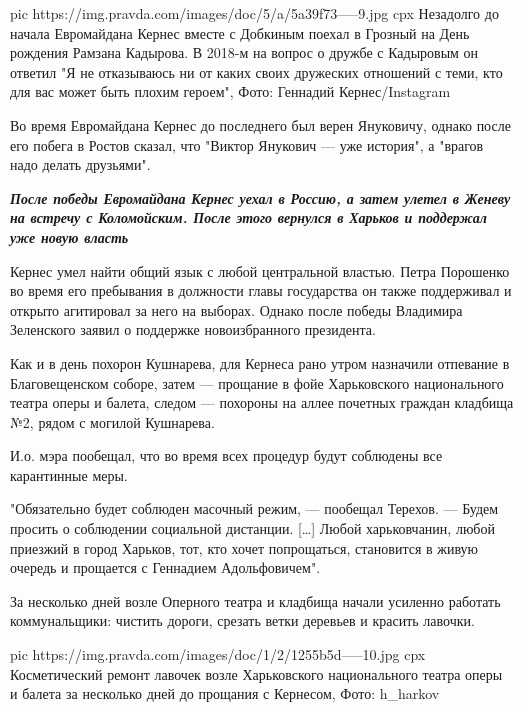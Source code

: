 \ifcmt
pic https://img.pravda.com/images/doc/5/a/5a39f73-----9.jpg
cpx Незадолго до начала Евромайдана Кернес вместе с Добкиным поехал в Грозный на День рождения Рамзана Кадырова. В 2018-м на вопрос о дружбе с Кадыровым он ответил "Я не отказываюсь ни от каких своих дружеских отношений с теми, кто для вас может быть плохим героем", Фото: Геннадий Кернес/Instagram
\fi

Во время Евромайдана Кернес до последнего был верен Януковичу, однако после его
побега в Ростов сказал, что "Виктор Янукович — уже история", а "врагов надо
делать друзьями". 


\begin{leftbar}
  \begingroup
    \em\Large\bfseries\color{blue} После победы Евромайдана Кернес уехал в
        Россию, а затем улетел в Женеву на встречу с Коломойским. После этого
        вернулся в Харьков и поддержал уже новую власть
  \endgroup
\end{leftbar}

Кернес умел найти общий язык с любой центральной властью. Петра Порошенко во
время его пребывания в должности главы государства он также поддерживал и
открыто агитировал за него на выборах. Однако после победы Владимира Зеленского
заявил о поддержке новоизбранного президента.

Как и в день похорон Кушнарева, для Кернеса рано утром назначили отпевание в
Благовещенском соборе, затем — прощание в фойе Харьковского национального
театра оперы и балета, следом — похороны на аллее почетных граждан кладбища №2,
рядом с могилой Кушнарева.

И.о. мэра пообещал, что во время всех процедур будут соблюдены все карантинные
меры.

"Обязательно будет соблюден масочный режим, — пообещал Терехов. — Будем просить
о соблюдении социальной дистанции. […] Любой харьковчанин, любой приезжий в
город Харьков, тот, кто хочет попрощаться, становится в живую очередь и
прощается с Геннадием Адольфовичем".

За несколько дней возле Оперного театра и кладбища начали усиленно работать
коммунальщики: чистить дороги, срезать ветки деревьев и красить лавочки.

\ifcmt
pic https://img.pravda.com/images/doc/1/2/1255b5d-----10.jpg
cpx Косметический ремонт лавочек возле Харьковского национального театра оперы и балета за несколько дней до прощания с Кернесом, Фото: h\_harkov
\fi

